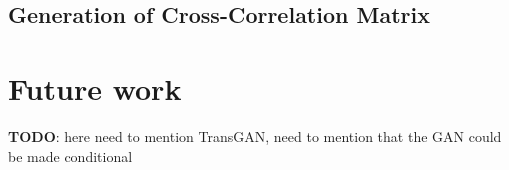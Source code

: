 \documentclass{article}
\begin{document}
\subsection{Generation of Cross-Correlation Matrix}


\section{Future work}

\textbf{TODO}: here need to mention TransGAN, need to mention that the GAN could be made conditional 


 



\end{document}
